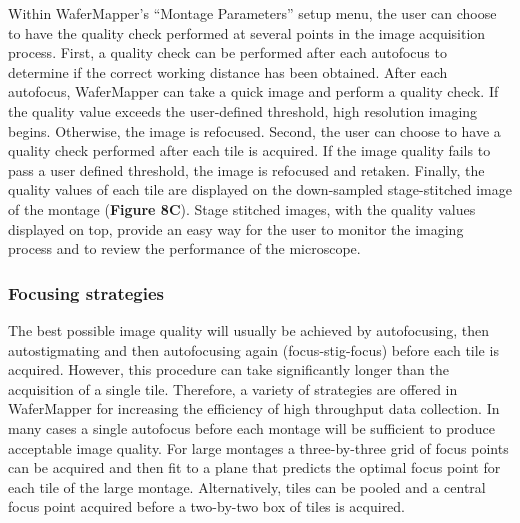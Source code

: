\documentclass{article}
\begin{document}
Within WaferMapper’s “Montage Parameters” setup menu, the user can choose to have the quality check performed at several points in the image acquisition process. First, a quality check can be performed after each autofocus to determine if the correct working distance has been obtained. After each autofocus, WaferMapper can take a quick image and perform a quality check. If the quality value exceeds the user-defined threshold, high resolution imaging begins. Otherwise, the image is refocused. Second, the user can choose to have a quality check performed after each tile is acquired. If the image quality fails to pass a user defined threshold, the image is refocused and retaken. Finally, the quality values of each tile are displayed on the down-sampled stage-stitched image of the montage (\textbf{Figure 8C}). Stage stitched images, with the quality values displayed on top, provide an easy way for the user to monitor the imaging process and to review the performance of the microscope.

\subsubsection*{Focusing strategies}

The best possible image quality will usually be achieved by autofocusing, then autostigmating and then autofocusing again (focus-stig-focus) before each tile is acquired. However, this procedure can take significantly longer than the acquisition of a single tile. Therefore, a variety of strategies are offered in WaferMapper for increasing the efficiency of high throughput data collection. In many cases a single autofocus before each montage will be sufficient to produce acceptable image quality. For large montages a three-by-three grid of focus points can be acquired and then fit to a plane that predicts the optimal focus point for each tile of the large montage. Alternatively, tiles can be pooled and a central focus point acquired before a two-by-two box of tiles is acquired.
\end{document}
